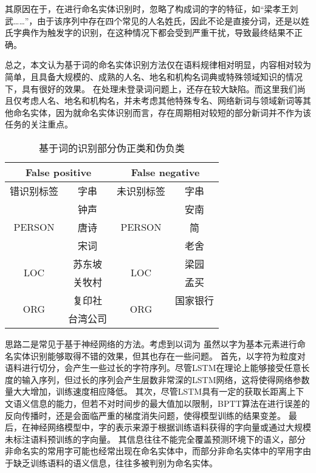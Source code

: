 其原因在于，在进行命名实体识别时，忽略了构成词的字的特征，如“梁孝王刘武……”，由于该序列中存在四个常见的人名姓氏，因此不论是直接分词，还是以姓氏字典作为触发字的识别，在这种情况下都会受到严重干扰，导致最终结果不正确。

总之，本文认为基于词的命名实体识别方法仅在语料规律相对明显，内容相对较为简单，且具备大规模的、成熟的人名、地名和机构名词典或特殊领域知识的情况下，具有很好的效果。
在处理未登录词问题上，还存在较大缺陷。而这里我们尚且仅考虑人名、地名和机构名，并未考虑其他特殊专名、网络新词与领域新词等其他命名实体，因为就命名实体识别而言，存在周期相对较短的部分新词并不作为该任务的关注重点。

\begin{table}[H]
    \centering
    \caption{基于词的识别部分伪正类和伪负类}
    \begin{tabular}{cccc}
        \toprule
        \multicolumn{2}{c}{False positive} & \multicolumn{2}{c}{False negative}\\
        \midrule
        错识别标签 & 字串 & 未识别标签 & 字串\\
        \cmidrule(lr){1-2}\cmidrule(lr){3-4}
        \multirow{3}{*}{PERSON} & 钟声 & \multirow{3}{*}{PERSON} & 安南 \\
        & 唐诗 & & 简 \\
        & 宋词 & & 老舍\\
        \cmidrule(lr){1-2}\cmidrule(lr){3-4}
        \multirow{2}{*}{LOC} & 苏东坡 & \multirow{2}{*}{LOC}& 梁园\\
        & 关牧村 & & 孟买 \\
        \cmidrule(lr){1-2}\cmidrule(lr){3-4}
        \multirow{2}{*}{ORG} & 复印社 & \multirow{2}{*}{ORG}& 国家银行\\
        & 台湾公司 & 联合国& \\
        \bottomrule
    \end{tabular}
    \label{tab:fp_fn_word}
\end{table}

思路二是常见于基于神经网络的方法。考虑到以词为
虽然以字为基本元素进行命名实体识别能够取得不错的效果，但其也存在一些问题。
首先，以字符为粒度对语料进行切分，会产生一些过长的字符序列。尽管LSTM在理论上能够接受任意长度的输入序列，但过长的序列会产生层数非常深的LSTM网络，这将使得网络参数量大大增加，训练速度相应降低。
其次，尽管LSTM具有一定的获取长距离上下文语义信息的能力，但若不对时间步的最大值加以限制，BPTT算法在进行误差的反向传播时，还是会面临严重的梯度消失问题，使得模型训练的结果变差。
最后，在神经网络模型中，字的表示来源于根据训练语料获得的字向量或通过大规模未标注语料预训练的字向量。
其信息往往不能完全覆盖预测环境下的语义，部分非命名实的常用字可能也经常出现在命名实体中，而部分非命名实体中的罕用字由于缺乏训练语料的语义信息，往往多被判别为命名实体。

